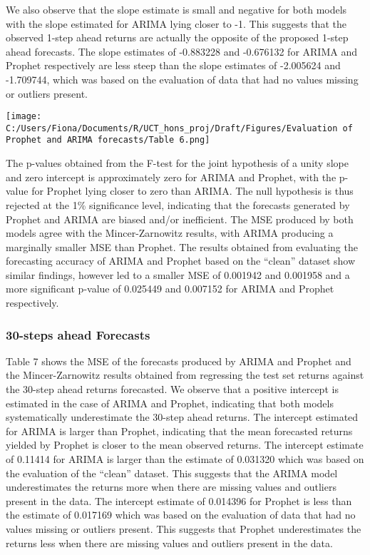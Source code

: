 \documentclass[12pt,a4paper]{article}
\numberwithin{equation}{section}
\numberwithin{figure}{section}
\numberwithin{table}{section}
\let\origfigure\figure
\let\endorigfigure\endfigure
\renewenvironment{figure}[1][2] {
    \expandafter\origfigure\expandafter[H]
} {
    \endorigfigure
}
\begin{document}
We also observe that the slope estimate is small and negative for both
models with the slope estimated for ARIMA lying closer to -1. This
suggests that the observed 1-step ahead returns are actually the
opposite of the proposed 1-step ahead forecasts. The slope estimates of
-0.883228 and -0.676132 for ARIMA and Prophet respectively are less
steep than the slope estimates of -2.005624 and -1.709744, which was
based on the evaluation of data that had no values missing or outliers
present.

\begin{figure}[htbp]
\centering
\texttt{[image: C:/Users/Fiona/Documents/R/UCT\_hons\_proj/Draft/Figures/Evaluation of Prophet and ARIMA forecasts/Table 6.png]}
\caption{Mincer-Zarnowitz results for 1-step ahead forecasts}
\end{figure}

The p-values obtained from the F-test for the joint hypothesis of a
unity slope and zero intercept is approximately zero for ARIMA and
Prophet, with the p-value for Prophet lying closer to zero than ARIMA.
The null hypothesis is thus rejected at the 1\% significance level,
indicating that the forecasts generated by Prophet and ARIMA are biased
and/or inefficient. The MSE produced by both models agree with the
Mincer-Zarnowitz results, with ARIMA producing a marginally smaller MSE
than Prophet. The results obtained from evaluating the forecasting
accuracy of ARIMA and Prophet based on the ``clean'' dataset show
similar findings, however led to a smaller MSE of 0.001942 and 0.001958
and a more significant p-value of 0.025449 and 0.007152 for ARIMA and
Prophet respectively.

\subsubsection{30-steps ahead Forecasts}\label{steps-ahead-forecasts-2}

Table 7 shows the MSE of the forecasts produced by ARIMA and Prophet and
the Mincer-Zarnowitz results obtained from regressing the test set
returns against the 30-step ahead returns forecasted. We observe that a
positive intercept is estimated in the case of ARIMA and Prophet,
indicating that both models systematically underestimate the 30-step
ahead returns. The intercept estimated for ARIMA is larger than Prophet,
indicating that the mean forecasted returns yielded by Prophet is closer
to the mean observed returns. The intercept estimate of 0.11414 for
ARIMA is larger than the estimate of 0.031320 which was based on the
evaluation of the ``clean'' dataset. This suggests that the ARIMA model
underestimates the returns more when there are missing values and
outliers present in the data. The intercept estimate of 0.014396 for
Prophet is less than the estimate of 0.017169 which was based on the
evaluation of data that had no values missing or outliers present. This
suggests that Prophet underestimates the returns less when there are
missing values and outliers present in the data.
\end{document}
